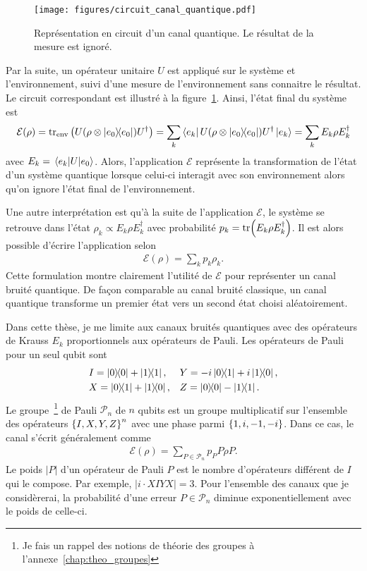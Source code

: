 \begin{figure}
  \begin{center}
    \texttt{[image: figures/circuit\_canal\_quantique.pdf]}
  \end{center}
  \caption[Représentation en circuit d'un canal quantique]{
    Représentation en circuit d'un canal quantique.
    Le résultat de la mesure est ignoré.
  }
  \label{fig:circuit_canal_quantique}
\end{figure}

Par la suite,
un opérateur unitaire $U$ est appliqué sur le système et l'environnement,
suivi d'une mesure de l'environnement sans connaitre le résultat.
Le circuit correspondant est illustré à la figure~\ref{fig:circuit_canal_quantique}.
Ainsi, l'état final du système est
\begin{equation}
  \mathcal{E}(\rho) 
  = \tr_{\text{env}}\qty(U(\rho \otimes \op{e_0})U^\dag)
  = \sum_k \bra{e_k}U(\rho \otimes \op{e_0}) U^\dag \ket{e_k}
  = \sum_k E_k \rho E_k^\dag
\end{equation}
avec $E_k = \mel{e_k}{U}{e_0}$.
Alors,
l'application $\mathcal{E}$ représente la transformation de l'état d'un système quantique
lorsque celui-ci interagit avec son environnement alors qu'on ignore l'état final
de l'environnement.

Une autre interprétation est qu'à la suite de l'application $\mathcal E$,
le système se retrouve dans l'état $\rho_k \propto E_k \rho E_k^\dag$
avec probabilité $p_k = \tr(E_k \rho E_k^\dag)$.
Il est alors possible d'écrire l'application selon
\begin{align}
  \mathcal E(\rho) = \sum_k p_k \rho_k.
\end{align}
Cette formulation montre clairement l'utilité de $\mathcal E$ pour
représenter un canal bruité quantique.
De façon comparable au canal bruité classique,
un canal quantique transforme un premier état 
vers un second état choisi aléatoirement.

Dans cette thèse,
je me limite aux canaux bruités quantiques avec des opérateurs 
de Krauss $E_k$ proportionnels aux opérateurs de Pauli.
Les opérateurs de Pauli pour un seul qubit sont 
\begin{align}
  &I = \op{0}{0} + \op{1}{1}, 
  &&Y = -i\op{0}{1} + i\op{1}{0}, \notag \\
  &X = \op{0}{1} + \op{1}{0}, 
  &&Z = \op{0}{0} - \op{1}{1}.
\end{align}
Le groupe~\footnote{Je fais un rappel des notions de théorie des groupes à l'annexe~\ref{chap:theo_groupes}}
de Pauli $\mathcal P_n$ de $n$ qubits est un groupe multiplicatif sur 
l'ensemble des opérateurs $\qty{I, X, Y, Z}^n$ avec une phase parmi $\qty{1, i, -1, -i}$.
Dans ce cas,
le canal s'écrit généralement comme
\begin{align}
  \mathcal E(\rho) = \sum_{P \in \mathcal P_n} p_P P\rho P.
\end{align}
Le poids $|P|$ d'un opérateur de Pauli $P$ est le nombre d'opérateurs différent de $I$ qui le compose.
Par exemple, $|i\cdot XIYX| = 3$.
Pour l'ensemble des canaux que je considèrerai,
la probabilité d'une erreur $P \in \mathcal P_n$ diminue exponentiellement avec le poids 
de celle-ci.


